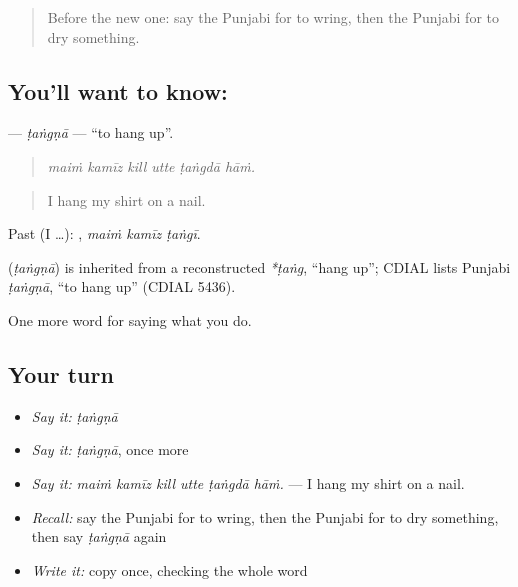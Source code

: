 \label{lesson:PA-C228-tangna}



\begin{quote}
Before the new one: say the Punjabi for to wring, then the Punjabi for to dry something.
\end{quote}

\subsection*{You'll want to know: }
\textbf{} — \emph{ṭaṅgṇā} — \textquotedblleft{}to hang up\textquotedblright{}.

\begin{quote}
     
\end{quote}

\begin{quote}
\emph{maiṁ kamīz kill utte ṭaṅgdā hāṁ.}
\end{quote}

\begin{quote}
I hang my shirt on a nail.
\end{quote}

Past (I …):   , \emph{maiṁ kamīz ṭaṅgī}.

\begin{cousinweb}
\textbf{} (\emph{ṭaṅgṇā}) is inherited from a reconstructed \emph{*ṭaṅg}, \textquotedblleft{}hang up\textquotedblright{}; CDIAL lists Punjabi \emph{ṭaṅgṇā}, \textquotedblleft{}to hang up\textquotedblright{} (CDIAL 5436).
\end{cousinweb}

\begin{grammarlens}[title={What you've built}]
One more word for saying what you do.
\end{grammarlens}

\subsection*{Your turn}
\begin{itemize}
\raggedright
  \item \emph{Say it:} \emph{ṭaṅgṇā}
  \item \emph{Say it:} \emph{ṭaṅgṇā}, once more
  \item \emph{Say it:} \emph{maiṁ kamīz kill utte ṭaṅgdā hāṁ.} — I hang my shirt on a nail.
  \item \emph{Recall:} say the Punjabi for to wring, then the Punjabi for to dry something, then say \emph{ṭaṅgṇā} again
  \item \emph{Write it:} copy \textbf{} once, checking the whole word
\end{itemize}

